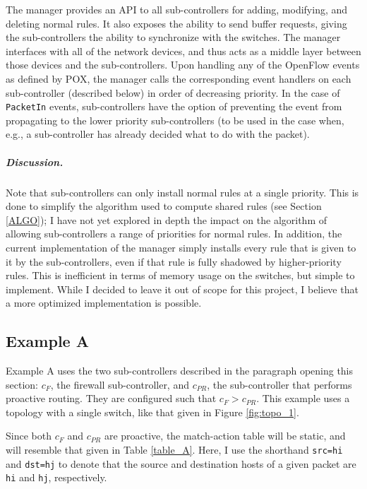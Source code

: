 \documentclass{article}
\begin{document}
The manager provides an API to all sub-controllers for adding, modifying,
and deleting normal rules. It also exposes the ability to send buffer
requests, giving the sub-controllers the ability to synchronize with the
switches.
The manager interfaces with all of the network devices, and thus acts as 
a middle layer between those devices and the sub-controllers.
Upon handling any of the OpenFlow events as defined by POX,
the manager calls the corresponding event handlers on each sub-controller
(described below) in order of decreasing priority. 
In the case of \texttt{PacketIn} events, sub-controllers have the option of
preventing the event from propagating to the lower priority sub-controllers
(to be used in the case when, e.g., a sub-controller has already decided
what to do with the packet).

\subparagraph{Discussion.}

Note that sub-controllers can only install normal rules at a single priority.
This is done to simplify the algorithm used to compute shared rules 
(see Section \ref{ALGO}); I have not yet explored in depth the impact on the 
algorithm of allowing sub-controllers a range of priorities for normal rules.
In addition, the current implementation of the manager simply installs 
every rule that is given to it by the sub-controllers, even if that rule 
is fully shadowed by higher-priority rules.
This is inefficient in terms of memory usage on the switches, but simple
to implement.
While I decided to leave it out of scope for this project, I believe that a
more optimized implementation is possible.

\subsection{Example A} \label{Ex_A}

Example A uses the two sub-controllers described in the paragraph opening
this section: $c_F$, the firewall sub-controller, and $c_{PR}$, 
the sub-controller that performs proactive routing. 
They are configured such that $c_F > c_{PR}$. This example uses
a topology with a single switch, like that given in Figure \ref{fig:topo_1}.

Since both $c_F$ and $c_{PR}$ are proactive, the match-action table
will be static, and will resemble that given in Table \ref{table_A}.
Here, I use the shorthand \texttt{src=hi} and \texttt{dst=hj} to denote that
the source and destination hosts of a given packet are 
\texttt{hi} and \texttt{hj}, respectively.
\end{document}
